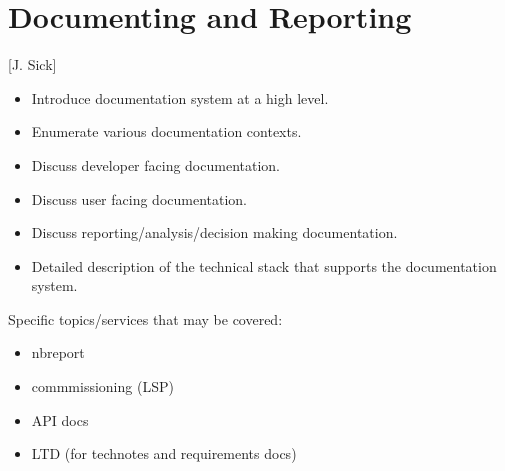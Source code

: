 \section{Documenting and Reporting} [J. Sick]
\begin{itemize}
\item Introduce documentation system at a high level.
\item Enumerate various documentation contexts.
\item Discuss developer facing documentation.
\item Discuss user facing documentation.
\item Discuss reporting/analysis/decision making documentation.
\item Detailed description of the technical stack that supports the documentation system.
\end{itemize}

Specific topics/services that may be covered:
\begin{itemize}
\item nbreport
\item commmissioning (LSP)
\item API docs
\item LTD (for technotes and requirements docs)
\end{itemize}
